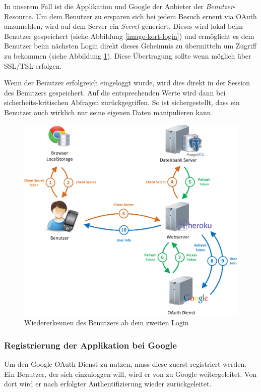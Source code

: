In unserem Fall ist \kort die Applikation und Google der Anbieter der \emph{Benutzer}-Resource.
Um dem Benutzer zu ersparen sich bei jedem Besuch erneut via \gls{OAuth} anzumelden, wird auf dem Server ein \emph{Secret} generiert.
Dieses wird lokal beim Benutzer gespeichert (siehe Abbildung \ref{image-kort-login}) und ermöglicht es dem Benutzer beim nächsten Login direkt dieses Geheimnis zu übermitteln um Zugriff zu bekommen (siehe Abbildung \ref{image-kort-relogin}).
Diese Übertragung sollte wenn möglich über SSL/TSL erfolgen.

Wenn der Benutzer erfolgreich eingeloggt wurde, wird dies direkt in der Session des Benutzers gespeichert.
Auf die entsprechenden Werte wird dann bei sicherheits-kritischen Abfragen zurückgegriffen.
So ist sichergestellt, dass ein Benutzer auch wirklich nur seine eigenen Daten manipulieren kann.

\begin{figure}[H]
	\centering
	\includegraphics[scale=0.4]{images/implementation/backend/kort-relogin}
	\caption{Wiedererkennen des Benutzers ab dem zweiten Login}
	\label{image-kort-relogin}
\end{figure}

\subsubsection{Registrierung der Applikation bei Google}
Um den Google \gls{OAuth} Dienst zu nutzen, muss diese zuerst registriert werden.
Ein Benutzer, der sich einzuloggen will, wird er von \kort zu Google weitergeleitet.
Von dort wird er nach erfolgter Authentifizierung wieder zurückgeleitet.

